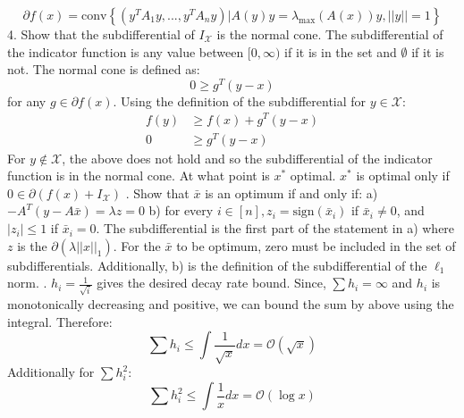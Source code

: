 \documentclass{article}
\begin{document}
\begin{equation*}
	\partial f(x) = \text{conv}\left\{ (y^TA_1y, ..., y^TA_ny) | A(y)y = \lambda_{\text{max}}(A(x))y, ||y|| = 1\right\}
\end{equation*}
4. Show that the subdifferential of $I_{\mathcal{X}}$ is the normal cone. \newline\newline
The subdifferential of the indicator function is any value between $[0, \infty)$ if it is in the set and $\emptyset$ if it is not. \newline
The normal cone is defined as:
\begin{equation*}
	0 \geq g^T(y-x)
\end{equation*}
for any $g \in \partial f(x)$. Using the definition of the subdifferential for $y \in \mathcal{X}$:
\begin{align*}
	f(y) &\geq f(x) + g^T(y-x) \\
	0 &\geq g^T(y-x)
\end{align*}
For $y \not\in \mathcal{X}$, the above does not hold and so the subdifferential of the indicator function is in the normal cone.  \newline\newline
At what point is $x^*$ optimal. \newline\newline
$x^*$ is optimal only if $0 \in \partial(f(x) + I_{\mathcal{X}})$ 
\newline{}. Show that $\bar{x}$ is an optimum if and only if: \newline
a) $-A^T(y- A\bar{x}) = \lambda z = 0$ \newline
b) for every $i \in [n], z_i = \text{sign}(\bar{x}_i)$ if $\bar{x}_i \neq 0$, and $ |z_i| \leq 1$ if $\bar{x}_i = 0$.  \newline
The subdifferential is the first part of the statement in a) where $z$ is the $\partial(\lambda||x||_1)$. For the $\bar{x}$ to be optimum, zero must be included in the set of subdifferentials. Additionally, b) is the definition of the subdifferential of the $\ell_1$ norm. \newline{}. $h_i = \frac{1}{\sqrt{i}}$ gives the desired decay rate bound. \newline
Since, $\sum{h_i} = \infty$ and $h_i$ is monotonically decreasing and positive, we can bound the sum by above using the integral. Therefore: 
\begin{equation*}
	\sum{h_i} \leq \int{\frac{1}{\sqrt{x}}dx} = \mathcal{O}(\sqrt{x})
\end{equation*}
Additionally for  $\sum{h_i^2}$:
\begin{equation*}
	\sum{h_i^2} \leq \int{\frac{1}{x}dx} = \mathcal{O}(\log x)
\end{equation*}
\end{document}
